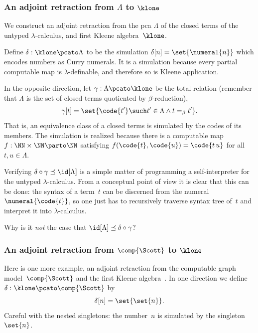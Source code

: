 \subsubsection{An adjoint retraction from $\Lambda$ to $\klone$}
\label{sec:adjo-retr-from}

We construct an adjoint retraction from the pca $\Lambda$ of the closed terms of the untyped $\lambda$-calculus, and first Kleene algebra~$\klone$.

Define $\delta : \klone \pcato \Lambda$ to be the simulation $\delta[n] = \set{\numeral{n}}$ which encodes numbers as Curry numerals.
%
It is a simulation because every partial computable map is $\lambda$-definable, and therefore so is Kleene application.

In the opposite direction, let $\gamma : \Lambda \pcato \klone$ be the total relation (remember that $\Lambda$ is the set of closed terms quotiented by $\beta$-reduction),
%
\begin{equation*}
  \gamma[t] = \set{ \code{t'} \such t' \in \Lambda \land t =_\beta t' }.
\end{equation*}
%
That is, an equivalence class of a closed terms is simulated by the codes of its members.
The simulation is realized because there is a computable map~$f : \NN \times \NN \parto \NN$ satisfying $f(\code{t}, \code{u}) = \code{t \, u}$ for all $t, u \in \Lambda$.

Verifying $\delta \circ \gamma \preceq \id[\Lambda]$ is a simple matter of programming a self-interpreter for the untyped $\lambda$-calculus. From a conceptual point of view it is clear that this can be done: the syntax of a term~$t$ can be discerned from the numeral $\numeral{\code{t}}$, so one just has to recursively traverse syntax tree of~$t$ and interpret it into $\lambda$-calculus.

\begin{exercise}
  Why is it \emph{not} the case that $\id[\Lambda] \preceq \delta \circ \gamma$?
\end{exercise}

\subsubsection{An adjoint retraction from $\comp{\Scott}$ to $\klone$}
\label{ex:pcamorphism_K1_RE}%

%
%
Here is one more example, an adjoint retraction from the computable graph model~$\comp{\Scott}$ and the first Kleene algebra~\cite[Proposition 3.3.7]{Longley:95}.
%
In one direction we define $\delta: \klone \pcato \comp{\Scott}$ by
%
\begin{equation*}
  \delta[n] = \set{\set{n}}.
\end{equation*}
%
Careful with the nested singletons: the number~$n$ is simulated by the singleton $\set{n}$.


